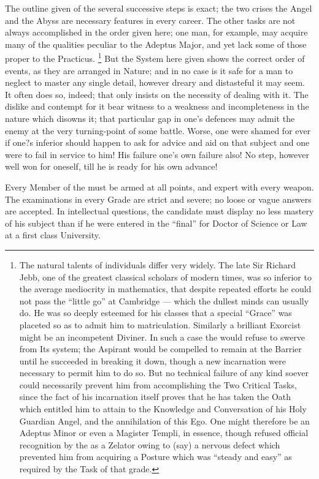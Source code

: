 The outline given of the several successive steps is exact; the two crises \textemdash{} the Angel and the Abyss \textemdash{} are necessary features in every career. The other tasks are not always accomplished in the order given here; one man, for example, may acquire many of the qualities peculiar to the Adeptus Major, and yet lack some of those proper to the Practicus. \footnote{The natural talents of individuals differ very widely. The late Sir Richard Jebb, one of the greatest classical scholars of modern times, was so inferior to the average mediocrity in mathematics, that despite repeated efforts he could not pass the \enquote{little go} at Cambridge — which the dullest minds can usually do. He was so deeply esteemed for his classes that a special \enquote{Grace} was placeted so as to admit him to matriculation. Similarly a brilliant Exorcist might be an incompetent Diviner. In such a case the \Argentium{} would refuse to swerve from Its system; the Aspirant would be compelled to remain at the Barrier until he succeeded in breaking it down, though a new incarnation were necessary to permit him to do so. But no technical failure of any kind soever could necessarily prevent him from accomplishing the Two Critical Tasks, since the fact of his incarnation itself proves that he has taken the Oath which entitled him to attain to the Knowledge and Conversation of his Holy Guardian Angel, and the annihilation of this Ego. One might therefore be an Adeptus Minor or even a Magister Templi, in essence, though refused official recognition by the \Argentium{} as a Zelator owing to (say) a nervous defect which prevented him from acquiring a Posture which was \enquote{steady and easy} as required by the Task of that grade.} But the System here given shows the correct order of events, as they are arranged in Nature; and in no case is it safe for a man to neglect to master any single detail, however dreary and distasteful it may seem. It often does so, indeed; that only insists on the necessity of dealing with it. The dislike and contempt for it bear witness to a weakness and incompleteness in the nature which disowns it; that particular gap in one's defences may admit the enemy at the very turning-point of some battle. Worse, one were shamed for ever if one?s inferior should happen to ask for advice and aid on that subject and one were to fail in service to him! His failure \textemdash{} one's own failure also! No step, however well won for oneself, till he is ready for his own advance!

Every Member of the \Argentium{} must be armed at all points, and expert with every weapon. The examinations in every Grade are strict and severe; no loose or vague answers are accepted. In intellectual questions, the candidate must display no less mastery of his subject than if he were entered in the \enquote{final} for Doctor of Science or Law at a first class University.

